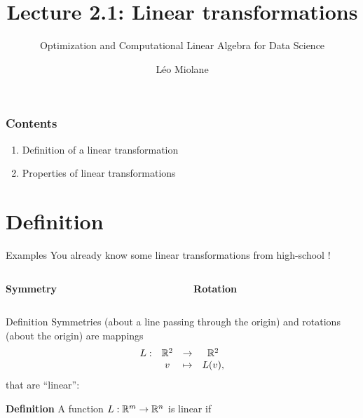 \documentclass{beamer}
\title{Lecture 2.1: Linear transformations}
\subtitle{Optimization and Computational Linear Algebra for Data Science}
\author{Léo Miolane}
\date{}
\begin{document}
\setcounter{showProgressBar}{0}
\setcounter{showSlideNumbers}{0}

\frame{\titlepage}

\begin{frame}
	\frametitle{Contents}
	\begin{enumerate}
		\item Definition of a linear transformation
			\vspace{1cm}
		\item Properties of linear transformations
	\end{enumerate}
\end{frame}


\setcounter{framenumber}{0}
\setcounter{showSlideNumbers}{1}
\section{Definition}
\begin{frame}[t]{Examples}
	You already know some linear transformations from high-school !

	\vspace{0.6cm}
	\begin{columns}
		\begin{column}{0.47\textwidth}
			\vspace{-0.25cm}
			\begin{center}
				\textbf{Symmetry}
			\end{center}
			\vspace{5cm}
		\end{column}
		\vrule
		\vrule
		\begin{column}{0.53\textwidth}
			\vspace{-0.5cm}
			\begin{center}
				\textbf{Rotation}
				\vspace{5cm}
			\end{center}
		\end{column}
	\end{columns}


\end{frame}

\begin{frame}[t]{Definition}
	Symmetries (about a line passing through the origin) and rotations (about the origin) are mappings
	$$
	\begin{array}{cccc}
		L: & \mathbb{R}^2 & \to & \mathbb{R}^2 \\
		   & v & \mapsto & L(v),
	\end{array}
	$$
	that are ``linear'':
	\vspace{0.3cm}
	\begin{block}{\bf Definition}
		A function $L: \mathbb{R}^m \to \mathbb{R}^n$ is linear if
	\end{block}
\end{frame}
\end{document}
